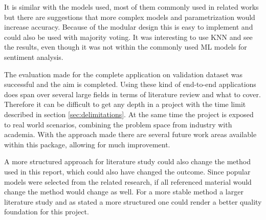 It is similar with the models used, most of them commonly used in related works but there are suggestions that more complex models and parametrization would increase accuracy. 
Because of the modular design this is easy to implement and could also be used with majority voting. 
It was interesting to use KNN and see the results, even though it was not within the commonly used ML models for sentiment analysis. 


The evaluation made for the complete application on validation dataset was successful and the aim is completed. 
Using these kind of end-to-end applications does span over several large fields in terms of literature review and what to cover. 
Therefore it can be difficult to get any depth in a project with the time limit described in section \autoref{sec:delimitations}. 
At the same time the project is exposed to real world scenarios, combining the problem space from industry with academia. 
With the approach made there are several future work areas available within this package, allowing for much improvement.


A more structured approach for literature study could also change the method used in this report, which could also have changed the outcome. 
Since popular models were selected from the related research, if all referenced material would change the method would change as well. 
For a more stable method a larger literature study and as stated a more structured one could render a better quality foundation for this project.